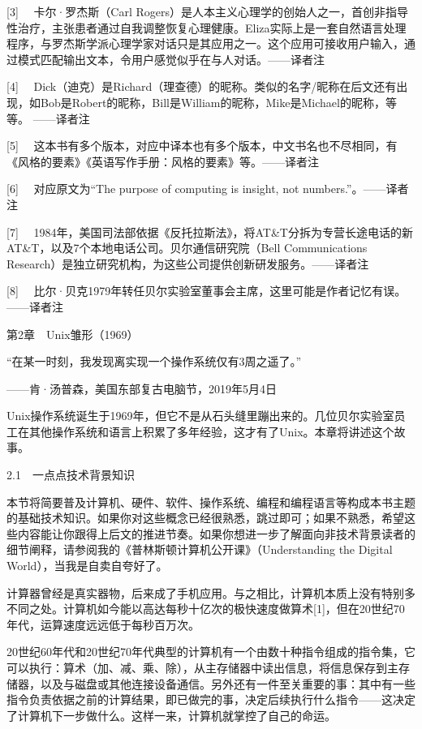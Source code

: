 \documentclass[a4paper,12pt,UTF8,twoside]{ctexbook}
\begin{document}
[3]　 卡尔·罗杰斯（Carl Rogers）是人本主义心理学的创始人之一，首创非指导性治疗，主张患者通过自我调整恢复心理健康。Eliza实际上是一套自然语言处理程序，与罗杰斯学派心理学家对话只是其应用之一。这个应用可接收用户输入，通过模式匹配输出文本，令用户感觉似乎在与人对话。——译者注

[4]　 Dick（迪克）是Richard（理查德）的昵称。类似的名字/昵称在后文还有出现，如Bob是Robert的昵称，Bill是William的昵称，Mike是Michael的昵称，等等。 ——译者注

[5]　 这本书有多个版本，对应中译本也有多个版本，中文书名也不尽相同，有《风格的要素》《英语写作手册：风格的要素》等。——译者注

[6]　 对应原文为“The purpose of computing is insight, not numbers.”。——译者注

[7]　 1984年，美国司法部依据《反托拉斯法》，将AT\&T分拆为专营长途电话的新AT\&T，以及7个本地电话公司。贝尔通信研究院（Bell Communications Research）是独立研究机构，为这些公司提供创新研发服务。——译者注

[8]　 比尔·贝克1979年转任贝尔实验室董事会主席，这里可能是作者记忆有误。——译者注





第2章　Unix雏形（1969）


“在某一时刻，我发现离实现一个操作系统仅有3周之遥了。”

——肯·汤普森，美国东部复古电脑节，2019年5月4日

Unix操作系统诞生于1969年，但它不是从石头缝里蹦出来的。几位贝尔实验室员工在其他操作系统和语言上积累了多年经验，这才有了Unix。本章将讲述这个故事。





2.1　一点点技术背景知识


本节将简要普及计算机、硬件、软件、操作系统、编程和编程语言等构成本书主题的基础技术知识。如果你对这些概念已经很熟悉，跳过即可；如果不熟悉，希望这些内容能让你跟得上后文的推进节奏。如果你想进一步了解面向非技术背景读者的细节阐释，请参阅我的《普林斯顿计算机公开课》（Understanding the Digital World），当我是自卖自夸好了。

计算器曾经是真实器物，后来成了手机应用。与之相比，计算机本质上没有特别多不同之处。计算机如今能以高达每秒十亿次的极快速度做算术[1]，但在20世纪70年代，运算速度远远低于每秒百万次。

20世纪60年代和20世纪70年代典型的计算机有一个由数十种指令组成的指令集，它可以执行：算术（加、减、乘、除），从主存储器中读出信息，将信息保存到主存储器，以及与磁盘或其他连接设备通信。另外还有一件至关重要的事：其中有一些指令负责依据之前的计算结果，即已做完的事，决定后续执行什么指令——这决定了计算机下一步做什么。这样一来，计算机就掌控了自己的命运。
\end{document}
